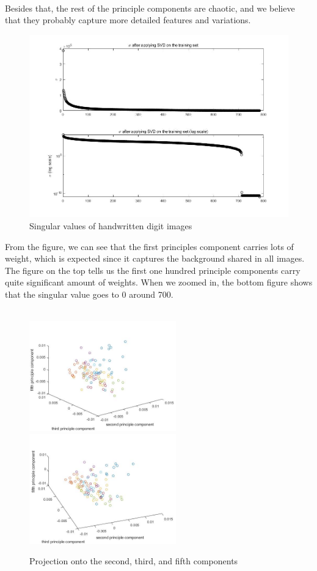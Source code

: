 \documentclass{article}
\begin{document}
~\\
Besides that, the rest of the principle components are chaotic, and we believe that they probably capture more detailed features and variations.
\newpage
\begin{figure}[h]
    \centerline{\includegraphics[width=5.5in]{S.jpg}}
    \caption{Singular values of handwritten digit images}
\end{figure}
From the figure, we can see that the first principles component carries lots of weight, which is expected since it captures the background shared in all images. The figure on the top tells us the first one hundred principle components carry quite significant amount of weights. When we zoomed in, the bottom figure shows that the singular value goes to 0 around 700. \\
~\\
\begin{figure}[h]
    \centerline{\includegraphics[width=2.5in]{V1.jpg}\includegraphics[width=2.5in]{V2.jpg}}
    \caption{Projection onto the second, third, and fifth components}
\end{figure}
\end{document}

